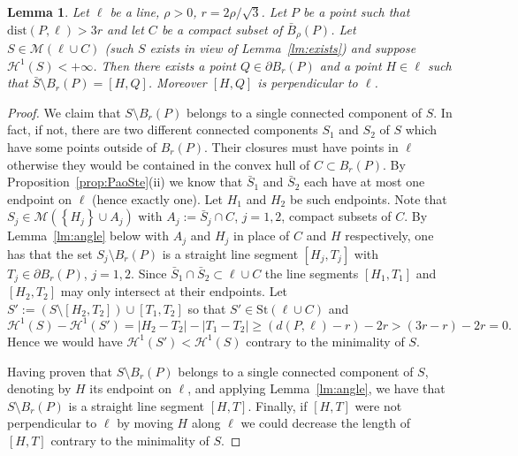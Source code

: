 \documentclass{amsart}
\renewcommand{\H}{\mathcal H}
\newcommand{\abs}[1]{\left\vert #1 \right\vert}
\newcommand{\ENCLOSE}[1]{\left\{#1\right\}}
\newcommand{\St}{\mathrm{St}}
\newcommand{\M}{\mathcal{M}}
\renewcommand{\H}{\mathcal{H}}
\newcommand{\dist}{\mathrm{dist}}
\newtheorem{lemma}[theorem]{Lemma}
\theoremstyle{definition}
\theoremstyle{remark}
\begin{document}
\begin{lemma}\label{lm:base}
  Let $\ell$ be a line, $\rho>0$, 
  $r=2\rho/\sqrt 3$.
  Let $P$ be a point such that $\dist(P,\ell)>3r$
  and let $C$ be a compact subset of $\bar B_\rho(P)$.
  Let $S \in \M(\ell\cup C)$ 
  (such $S$ exists in view of Lemma~\ref{lm:exists})
  and suppose $\H^1(S)<+\infty$.
  Then there exists a point $Q\in \partial B_r(P)$ 
  and a point $H\in \ell$
  such that $\bar S\setminus B_r(P) = [H,Q]$.
  Moreover $[H,Q]$ is perpendicular to $\ell$.
\end{lemma}
\begin{proof}
  We claim that $S\setminus B_r(P)$ belongs to 
  a single connected component of $S$. 
  In fact, if not, there are two different connected components 
  $S_1$ and $S_2$ of $S$ which have some points outside of 
  $B_r(P)$. 
  Their closures must have points in $\ell$ otherwise 
  they would be contained in the convex hull of $C\subset B_r(P)$.
  By Proposition~\ref{prop:PaoSte}(ii) we know  
  that $\bar S_1$ and $\bar S_2$ each have 
  at most one endpoint on $\ell$ (hence exactly one).
  Let $H_1$ and $H_2$ be such endpoints.
  Note that $S_j\in \M(\ENCLOSE{H_j}\cup A_j)$ 
  with $A_j:=\bar S_j\cap C$, $j=1,2$, compact subsets of $C$. 
  By Lemma~\ref{lm:angle} below
  with $A_j$ and $H_j$ in place of $C$ and $H$ respectively,
  one has that
  the set $S_j\setminus B_r(P)$ is a straight line segment $[H_j,T_j]$
  with $T_j\in \partial B_r(P)$, $j=1,2$.
  Since $\bar S_1\cap \bar S_2\subset \ell\cup C$ 
  the line segments $[H_1,T_1]$ and $[H_2,T_2]$ may only intersect at their endpoints.
  Let $S':=(S\setminus [H_2,T_2])\cup[T_1,T_2]$ so that 
  $S'\in \St(\ell\cup C)$ and
  \[
    \H^1(S) - \H^1(S')
    = \abs{H_2 - T_2} - \abs{T_1 - T_2}
    \ge (d(P,\ell)-r) - 2r 
    > (3r-r) - 2r = 0. 
  \]
  Hence we would have $\H^1(S')<\H^1(S)$ contrary to the minimality of $S$.

  Having proven that $S\setminus B_r(P)$ belongs to a single 
  connected component of $S$, 
  denoting by $H$ its endpoint on $\ell$,
  and applying Lemma~\ref{lm:angle}, we have that 
  $S\setminus B_r(P)$ is a straight line segment $[H,T]$.
  Finally, if $[H,T]$ were not perpendicular to $\ell$ by moving $H$ along $\ell$ 
  we could decrease the length of $[H,T]$ contrary to the minimality 
  of $S$.
\end{proof}
  
\end{document}
